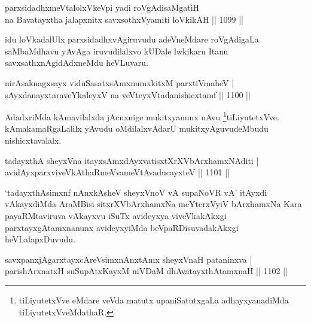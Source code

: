 \begin{shl}
parxsidadhxmeVtalolxVkeV\s pi yadi roVgAdisaMgatiH \\
na Bavatayxtha jalapxnitx savxsothxV\s yamiti loVkikAH \hfill ||  1099 || 
\end{shl}

\begin{artha}
idu loVkadalUlx parxsidadhxvAgiruvudu adeVneMdare roVgAdigaLa saMbaMdhavu yAvAga iruvudilalxvo kUDale lwkikaru Itanu savxsathxnAgidAdxneMdu heVLuvaru.
\end{artha}


\begin{shl}
nirAsaknagxsayx viduSasatxsAmxnumxkitxM parxtiVmaheV | \\
\footnotemark[2]sAyxdanayxtaraveYkaleyxV na veVteyxVtadanishicxtamf \hfill||  1100 ||  
\end{shl}

\begin{artha}
AdadxriMda kAmavilalxda jAcnxnige mukitxyanunx nAvu \footnote[3]{tiLiyutetxVve eMdare veVda matutx upaniSatutxgaLa adhayxyanadiMda tiLiyutetxVveMdathaR.}tiLiyutetxVve. kAmakamaRgaLalilx yAvudu oMdilalxvAdarU mukitxyAguvudeMbudu nishicxtavalalx.
\end{artha}


\begin{shl}
tadayxthA sheyxVna itayxsAmxdAyxvatisxtXrXVbArxhamxNAditi | \\
avidAyxparxviveVkAthaRmeVvameVtAvaducayxteV \hfill||  1101 ||  
\end{shl}

\begin{artha}
`tadayxthAsimxnf nAnxkAsheV sheyxVnoV vA supaNoVR vA' itAyxdi vAkayxdiMda AraMBisi sitxrXVbArxhamxNa meYterxVyiV bArxhamxNa Kara payaRMtaviruva vAkayxvu iSuTx avideyxya viveVkakAkxgi parxtayxgAtamxnanunx avideyxyiMda beVpaRDisuvadakAkxgi heVLalapxDuvudu.
\end{artha}


\begin{shl}
savxpanxjAgarxtayxcAreV\s simxnAnxtAmx sheyxVnaH pataninxva | \\
parishArxnatxH suSupAtxKayxM niVDaM dhAvatayxthA\s \s tamxnaH \hfill||  1102 ||  
\end{shl}

